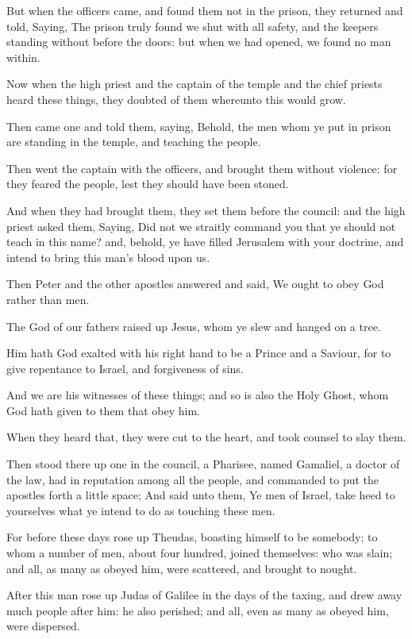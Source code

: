 \Verse But when the officers came, and found them not in the prison, they returned and told, \Verse Saying, The prison truly found we shut with all safety, and the keepers standing without before the doors: but when we had opened, we found no man within.

\Verse Now when the high priest and the captain of the temple and the chief priests heard these things, they doubted of them whereunto this would grow.

\Verse Then came one and told them, saying, Behold, the men whom ye put in prison are standing in the temple, and teaching the people.

\Verse Then went the captain with the officers, and brought them without violence: for they feared the people, lest they should have been stoned.

\Verse And when they had brought them, they set them before the council: and the high priest asked them, \Verse Saying, Did not we straitly command you that ye should not teach in this name? and, behold, ye have filled Jerusalem with your doctrine, and intend to bring this man's blood upon us.

\Verse Then Peter and the other apostles answered and said, We ought to obey God rather than men.

\Verse The God of our fathers raised up Jesus, whom ye slew and hanged on a tree.

\Verse Him hath God exalted with his right hand to be a Prince and a Saviour, for to give repentance to Israel, and forgiveness of sins.

\Verse And we are his witnesses of these things; and so is also the Holy Ghost, whom God hath given to them that obey him.

\Verse When they heard that, they were cut to the heart, and took counsel to slay them.

\Verse Then stood there up one in the council, a Pharisee, named Gamaliel, a doctor of the law, had in reputation among all the people, and commanded to put the apostles forth a little space; \Verse And said unto them, Ye men of Israel, take heed to yourselves what ye intend to do as touching these men.

\Verse For before these days rose up Theudas, boasting himself to be somebody; to whom a number of men, about four hundred, joined themselves: who was slain; and all, as many as obeyed him, were scattered, and brought to nought.

\Verse After this man rose up Judas of Galilee in the days of the taxing, and drew away much people after him: he also perished; and all, even as many as obeyed him, were dispersed.

